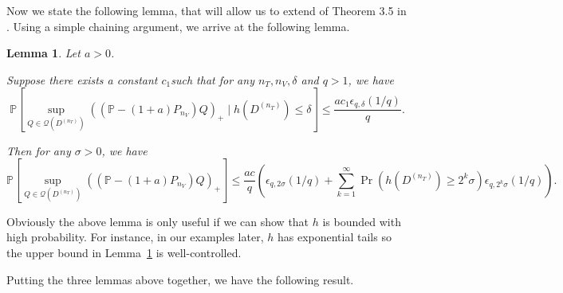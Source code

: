 \documentclass[10pt]{book}
\newtheorem{lemma}{Lemma}
\theoremstyle{definition}
\begin{document}
Now we state the following lemma, that will allow us to extend of Theorem 3.5 in \citet{lecue2012oracle}.
Using a simple chaining argument, we arrive at the following lemma.
\begin{lemma}
	\label{lemma:chain}
Let $a>0$.

Suppose there exists a constant $c_{1}$such that for any $n_{T},n_{V},\delta$
and $q>1$, we have 
\[
\mathbb{P}\left[\sup_{Q\in\mathcal{Q}(D^{(n_{T})})}\left(\left(\mathbb{P}-(1+a)P_{n_{V}}\right)Q\right)_{+}\mid h\left(D^{(n_{T})}\right)\le\delta\right]\le\frac{ac_{1}\epsilon_{q,\delta}(1/q)}{q}.
\]

Then for any $\sigma > 0$, we have
\[
\mathbb{P}\left[\sup_{Q\in\mathcal{Q}(D^{(n_{T})})}\left(\left(\mathbb{P}-(1+a)P_{n_{V}}\right)Q\right)_{+}\right]
\le
\frac{ac}{q}
\left(
\epsilon_{q,2\sigma}(1/q)
+\sum_{k=1}^{\infty}\Pr\left(h\left(D^{(n_{T})}\right)\ge2^{k}\sigma\right)
\epsilon_{q,2^{k}\sigma}(1/q)
\right)
.
\]
\end{lemma}
Obviously the above lemma is only useful if we can show that $h$ is bounded with high probability.
For instance, in our examples later, $h$ has exponential tails so the upper bound in Lemma~\ref{lemma:chain} is well-controlled.

Putting the three lemmas above together, we have the following result.
\end{document}
